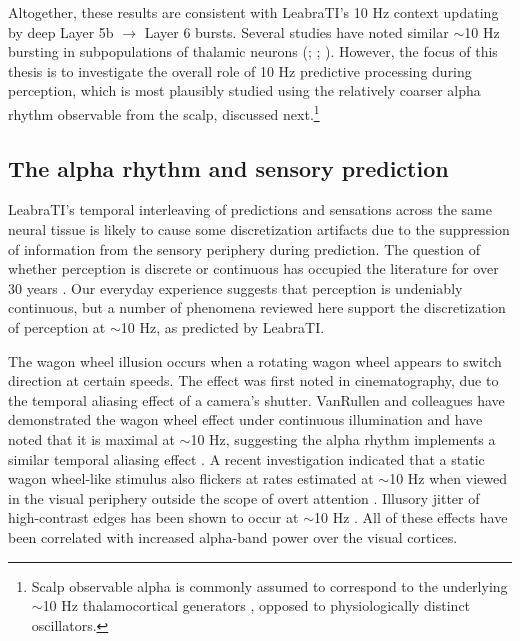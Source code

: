 \documentclass[dwyatte_dissertation.tex]{subfiles}
\begin{document}
Altogether, these results are consistent with LeabraTI's 10 Hz context updating by deep Layer 5b $\rightarrow$ Layer 6 bursts. Several studies have noted similar $\sim$10 Hz bursting in subpopulations of thalamic neurons (; ; ). However, the focus of this thesis is to investigate the overall role of 10 Hz predictive processing during perception, which is most plausibly studied using the relatively coarser alpha rhythm observable from the scalp, discussed next.\footnote{Scalp observable alpha is commonly assumed to correspond to the underlying $\sim$10 Hz thalamocortical generators \cite{LopesdaSilva91,KlimeschSausengHanslmayr07,PalvaPalva07,LorinczKekesiJuhaszEtAl09,BollimuntaMoSchroederEtAl11,HanslmayrGrossKlimeschEtAl11}, opposed to physiologically distinct oscillators.}

\subsection{The alpha rhythm and sensory prediction}
LeabraTI's temporal interleaving of predictions and sensations across the same neural tissue is likely to cause some discretization artifacts due to the suppression of information from the sensory periphery during prediction. The question of whether perception is discrete or continuous has occupied the literature for over 30 years \cite[see][for a review]{VanRullenKoch03b}. Our everyday experience suggests that perception is undeniably continuous, but a number of phenomena reviewed here support the discretization of perception at $\sim$10 Hz, as predicted by LeabraTI.

The wagon wheel illusion occurs when a rotating wagon wheel appears to switch direction at certain speeds. The effect was first noted in cinematography, due to the temporal aliasing effect of a camera's shutter. VanRullen and colleagues have demonstrated the wagon wheel effect under continuous illumination and have noted that it is maximal at $\sim$10 Hz, suggesting the alpha rhythm implements a similar temporal aliasing effect \cite{VanRullenReddyKoch05,VanRullenReddyKoch06}. A recent investigation indicated that a static wagon wheel-like stimulus also flickers at rates estimated at $\sim$10 Hz when viewed in the visual periphery outside the scope of overt attention \cite{SokoliukVanRullen13}. Illusory jitter of high-contrast edges has been shown to occur at $\sim$10 Hz \cite{AmanoArnoldTakedaEtAl08}. All of these effects have been correlated with increased alpha-band power over the visual cortices.
\end{document}
